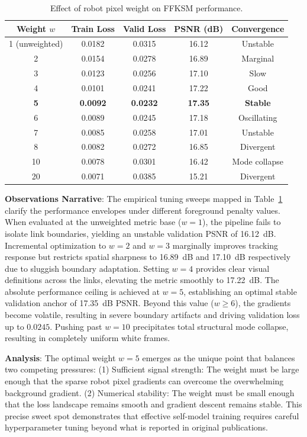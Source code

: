 \documentclass[12pt,a4paper,oneside]{report}
\begin{document}
\begin{table}[H]
\centering
\caption{Effect of robot pixel weight on FFKSM performance.}
\label{tab:weight_tuning}
\begin{tabular}{ccccc}
\toprule
Weight $w$ & Train Loss & Valid Loss & PSNR (dB) & Convergence \\
\midrule
1 (unweighted) & 0.0182 & 0.0315 & 16.12 & Unstable \\
2 & 0.0154 & 0.0278 & 16.89 & Marginal \\
3 & 0.0123 & 0.0256 & 17.10 & Slow \\
4 & 0.0101 & 0.0241 & 17.22 & Good \\
\textbf{5} & \textbf{0.0092} & \textbf{0.0232} & \textbf{17.35} & \textbf{Stable} \\
6 & 0.0089 & 0.0245 & 17.18 & Oscillating \\
7 & 0.0085 & 0.0258 & 17.01 & Unstable \\
8 & 0.0082 & 0.0272 & 16.85 & Divergent \\
10 & 0.0078 & 0.0301 & 16.42 & Mode collapse \\
20 & 0.0071 & 0.0385 & 15.21 & Divergent \\
\bottomrule
\end{tabular}
\end{table}

\textbf{Observations Narrative}: The empirical tuning sweeps mapped in Table~\ref{tab:weight_tuning} clarify the performance envelopes under different foreground penalty values. When evaluated at the unweighted metric base ($w=1$), the pipeline fails to isolate link boundaries, yielding an unstable validation PSNR of 16.12~dB. Incremental optimization to $w=2$ and $w=3$ marginally improves tracking response but restricts spatial sharpness to 16.89~dB and 17.10~dB respectively due to sluggish boundary adaptation. Setting $w=4$ provides clear visual definitions across the links, elevating the metric smoothly to 17.22~dB. The absolute performance ceiling is achieved at $w=5$, establishing an optimal stable validation anchor of 17.35~dB PSNR. Beyond this value ($w \ge 6$), the gradients become volatile, resulting in severe boundary artifacts and driving validation loss up to $0.0245$. Pushing past $w=10$ precipitates total structural mode collapse, resulting in completely uniform white frames.

\textbf{Analysis}: The optimal weight $w = 5$ emerges as the unique point that balances two competing pressures: (1) Sufficient signal strength: The weight must be large enough that the sparse robot pixel gradients can overcome the overwhelming background gradient. (2) Numerical stability: The weight must be small enough that the loss landscape remains smooth and gradient descent remains stable. This precise sweet spot demonstrates that effective self-model training requires careful hyperparameter tuning beyond what is reported in original publications.
\end{document}
